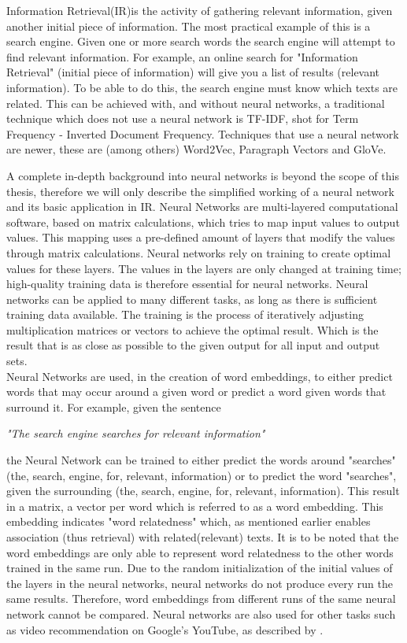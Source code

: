 \documentclass[../../Thesis.tex]{subfiles}
\begin{document}
Information Retrieval(IR)is the activity of gathering relevant information, given another initial piece of information. The most practical example of this is a search engine. Given one or more search words the search engine will attempt to find relevant information. For example, an online search for "Information Retrieval" (initial piece of information) will give you a list of results (relevant information). To be able to do this, the search engine must know which texts are related. This can be achieved with, and without neural networks, a traditional technique which does not use a neural network is TF-IDF, shot for Term Frequency - Inverted Document Frequency. Techniques that use a neural network are newer, these are (among others) Word2Vec, Paragraph Vectors and GloVe.

A complete in-depth background into neural networks is beyond the scope of this thesis, therefore we will only describe the simplified working of a neural network and its basic application in IR.
Neural Networks are multi-layered computational software, based on matrix calculations, which tries to map input values to output values. This mapping uses a pre-defined amount of layers that modify the values through matrix calculations. Neural networks rely on training to create optimal values for these layers. The values in the layers are only changed at training time; high-quality training data is therefore essential for neural networks. Neural networks can be applied to many different tasks, as long as there is sufficient training data available. The training is the process of iteratively adjusting multiplication matrices or vectors to achieve the optimal result. Which is the result that is as close as possible to the given output for all input and output sets.\\Neural Networks are used, in the creation of word embeddings, to either predict words that may occur around a given word or predict a word given words that surround it. For example, given the sentence\\
\begin{center}
\textit{"The search engine searches for relevant information"}
\end{center}
the Neural Network can be trained to either predict the words around "searches" (the, search, engine, for, relevant, information) or to predict the word "searches", given the surrounding (the, search, engine, for, relevant, information). This result in a matrix, a vector per word which is referred to as a word embedding. This embedding indicates "word relatedness" which, as mentioned earlier enables association (thus retrieval) with related(relevant) texts. It is to be noted that the word embeddings are only able to represent word relatedness to the other words trained in the same run. Due to the random initialization of the initial values of the layers in the neural networks, neural networks do not produce every run the same results. Therefore, word embeddings from different runs of the same neural network cannot be compared. Neural networks are also used for other tasks such as video recommendation on Google's YouTube, as described by \citet{covington2016deep}.
\end{document}
